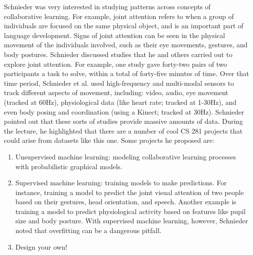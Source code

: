 \documentclass{article}
\begin{document}
Schnieder was very interested in studying patterns across concepts of collaborative learning. For example, joint attention refers to when a group of individuals are focused on the same physical object, and is an important part of language development. Signs of joint attention can be seen in the physical movement of the individuals involved, such as their eye movements, gestures, and body postures. Schnieder discussed studies that he and others carried out to explore joint attention. For example, one study gave forty-two pairs of two participants a task to solve, within a total of forty-five minutes of time. Over that time period, Schnieder et al. used high-frequency and multi-modal sensors to track different aspects of movement, including: video, audio, eye movement (tracked at 60Hz), physiological data (like heart rate; tracked at 1-30Hz), and even body posing and coordination (using a Kinect; tracked at 30Hz). Schnieder pointed out that these sorts of studies provide massive amounts of data. During the lecture, he highlighted that there are a number of cool CS 281 projects that could arise from datasets like this one. Some projects he proposed are:
\begin{enumerate}

\item Unsupervised machine learning: modeling collaborative learning processes with probabilistic graphical models.
\item Supervised machine learning: training models to make predictions. For instance, training a model to predict the joint visual attention of two people based on their gestures, head orientation, and speech. Another example is training a model to predict physiological activity based on features like pupil size and body posture. With supervised machine learning, however, Schnieder noted that overfitting can be a dangerous pitfall.
\item Design your own!

\end{enumerate}
\end{document}
